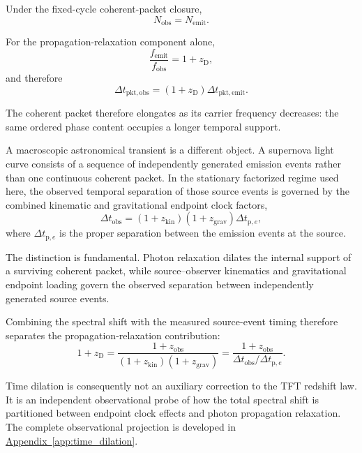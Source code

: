Under the fixed-cycle coherent-packet closure,
\begin{equation}
    N_{\mathrm{obs}}
    =
    N_{\mathrm{emit}}.
\end{equation}

For the propagation-relaxation component alone,
\begin{equation}
    \frac{f_{\mathrm{emit}}}{f_{\mathrm{obs}}}
    =
    1+z_{\mathrm D},
\end{equation}
and therefore
\begin{equation}
    \Delta t_{\mathrm{pkt,obs}}
    =
    (1+z_{\mathrm D})
    \Delta t_{\mathrm{pkt,emit}}.
\end{equation}

The coherent packet therefore elongates as its carrier frequency decreases: the same ordered phase content occupies a longer temporal support.

A macroscopic astronomical transient is a different object. A supernova light curve consists of a sequence of independently generated emission events rather than one continuous coherent packet. In the stationary factorized regime used here, the observed temporal separation of those source events is governed by the combined kinematic and gravitational endpoint clock factors,
\begin{equation}
    \Delta t_{\mathrm{obs}}
    =
    (1+z_{\mathrm{kin}})
    (1+z_{\mathrm{grav}})
    \Delta t_{\mathrm p,e},
\end{equation}
where $\Delta t_{\mathrm p,e}$ is the proper separation between the emission events at the source.

The distinction is fundamental. Photon relaxation dilates the internal support of a surviving coherent packet, while source--observer kinematics and gravitational endpoint loading govern the observed separation between independently generated source events.

Combining the spectral shift with the measured source-event timing therefore separates the propagation-relaxation contribution:
\begin{equation}
    1+z_{\mathrm D}
    =
    \frac{
        1+z_{\mathrm{obs}}
    }{
        (1+z_{\mathrm{kin}})
        (1+z_{\mathrm{grav}})
    }
    =
    \frac{
        1+z_{\mathrm{obs}}
    }{
        \Delta t_{\mathrm{obs}}/
        \Delta t_{\mathrm p,e}
    }.
\end{equation}

Time dilation is consequently not an auxiliary correction to the TFT redshift law. It is an independent observational probe of how the total spectral shift is partitioned between endpoint clock effects and photon propagation relaxation. The complete observational projection is developed in
\hyperref[app:time_dilation]{Appendix~\ref*{app:time_dilation}}.


